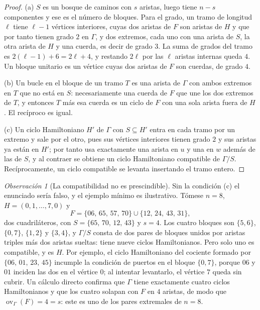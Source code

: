 \documentclass[11pt,a4paper]{article}
\theoremstyle{definition}
\theoremstyle{remark}
\newtheorem{observacion}[teorema]{Observación}
\newcommand{\ov}{\operatorname{ov}}
\begin{document}
\begin{proof}
(a) $S$ es un bosque de caminos con $s$ aristas, luego tiene $n-s$ componentes y ese es el número de bloques. Para el grado, un tramo de longitud $\ell$ tiene $\ell-1$ vértices interiores, cuyas dos aristas de $F$ son aristas de $H$ y que por tanto tienen grado $2$ en $\Gamma$, y dos extremos, cada uno con una arista de $S$, la otra arista de $H$ y una cuerda, es decir de grado $3$. La suma de grados del tramo es $2(\ell-1)+6=2\ell+4$, y restando $2\ell$ por las $\ell$ aristas internas queda $4$. Un bloque unitario es un vértice cuyas dos aristas de $F$ son cuerdas, de grado $4$.

(b) Un bucle en el bloque de un tramo $T$ es una arista de $\Gamma$ con ambos extremos en $T$ que no está en $S$: necesariamente una cuerda de $F$ que une los dos extremos de $T$, y entonces $T$ más esa cuerda es un ciclo de $F$ con una sola arista fuera de $H$. El recíproco es igual.

(c) Un ciclo Hamiltoniano $H'$ de $\Gamma$ con $S\subseteq H'$ entra en cada tramo por un extremo y sale por el otro, pues sus vértices interiores tienen grado $2$ y sus aristas ya están en $H'$; por tanto usa exactamente una arista en $u$ y una en $w$ además de las de $S$, y al contraer se obtiene un ciclo Hamiltoniano compatible de $\Gamma/S$. Recíprocamente, un ciclo compatible se levanta insertando el tramo entero.
\end{proof}

\begin{observacion}[La compatibilidad no es prescindible]\label{obs:puertos}
Sin la condición (c) el enunciado sería falso, y el ejemplo mínimo es ilustrativo. Tómese $n=8$, $H=(0,1,\dots,7,0)$ y
\[
F=\{06,\,65,\,57,\,70\}\cup\{12,\,24,\,43,\,31\},
\]
dos cuadriláteros, con $S=\{65,\,70,\,12,\,43\}$ y $s=4$. Los cuatro bloques son $\{5,6\}$, $\{0,7\}$, $\{1,2\}$ y $\{3,4\}$, y $\Gamma/S$ consta de dos pares de bloques unidos por aristas triples más dos aristas sueltas: tiene nueve ciclos Hamiltonianos. Pero solo uno es compatible, y es $H$. Por ejemplo, el ciclo Hamiltoniano del cociente formado por $\{06,\,01,\,23,\,45\}$ incumple la condición de puertos en el bloque $\{0,7\}$, porque $06$ y $01$ inciden las dos en el vértice $0$; al intentar levantarlo, el vértice $7$ queda sin cubrir. Un cálculo directo confirma que $\Gamma$ tiene exactamente cuatro ciclos Hamiltonianos y que los cuatro solapan con $F$ en $4$ aristas, de modo que $\ov_\Gamma(F)=4=s$: este es uno de los pares extremales de $n=8$.
\end{observacion}
\end{document}
